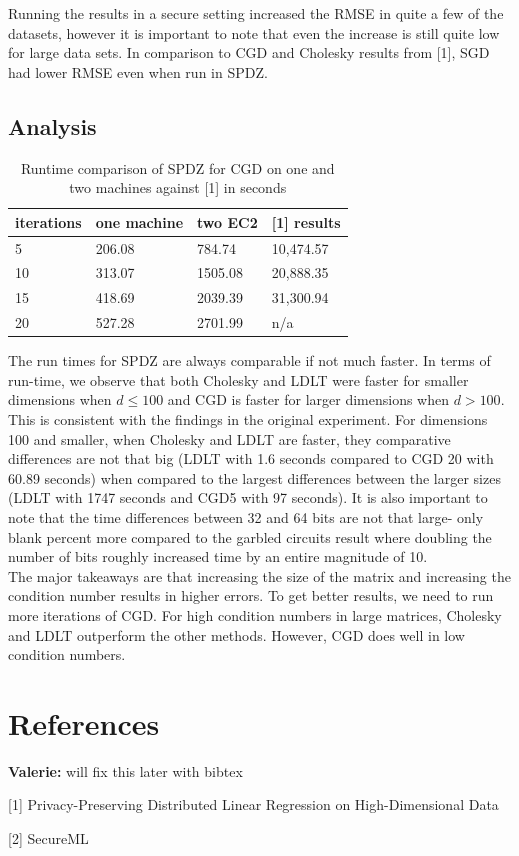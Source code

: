 \documentclass{article}
\theoremstyle{plain}
\theoremstyle{definition}
\theoremstyle{remark}
\newcommand{\vc}[1]{{\textcolor{lred}{\textbf{Valerie:} #1}}}
\begin{document}
\noindent
Running the results in a secure setting increased the RMSE in quite a few of the datasets, however it is important to note that even the increase is still quite low for large data sets. In comparison to CGD and Cholesky results from [1], SGD had lower RMSE even when run in SPDZ. 

\subsection{Analysis}

\begin{table}[H]
\centering
\label{my-label}
\begin{tabular}{@{}llll@{}}
\toprule
iterations & one machine      & two EC2      & {[}1{]} results    \\ \midrule
5     & 206.08 & 784.74  & 10,474.57 \\
10    & 313.07 & 1505.08 & 20,888.35 \\
15    & 418.69 & 2039.39 & 31,300.94 \\
20    & 527.28 & 2701.99 & n/a        \\ \bottomrule
\end{tabular}
\caption{Runtime comparison of SPDZ for CGD on one and two machines against [1] in seconds}
\end{table}

\noindent
The run times for SPDZ are always comparable if not much faster. In terms of run-time, we observe that both Cholesky and LDLT were faster for smaller dimensions when $d \leq 100$ and CGD is faster for larger dimensions when $d > 100$. This is consistent with the findings in the original experiment. For dimensions 100 and smaller, when Cholesky and LDLT are faster, they comparative differences are not that big (LDLT with 1.6 seconds compared to CGD 20 with 60.89 seconds) when compared to the largest differences between the larger sizes (LDLT with 1747 seconds and CGD5 with 97 seconds). It is also important to note that the time differences between 32 and 64 bits are not that large- only blank percent more compared to the garbled circuits result where doubling the number of bits roughly increased time by an entire magnitude of 10.  \\

\noindent
The major takeaways are that increasing the size of the matrix and increasing the condition number results in higher errors. To get better results, we need to run more iterations of CGD. For high condition numbers in large matrices, Cholesky and LDLT outperform the other methods. However, CGD does well in low condition numbers. 

\section{References}

\vc{will fix this later with bibtex}

[1] Privacy-Preserving Distributed Linear Regression on High-Dimensional Data

[2] SecureML
\end{document}
